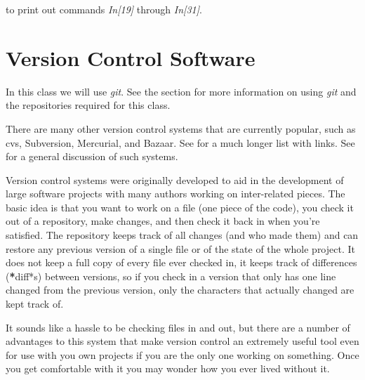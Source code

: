 \documentclass[letterpaper,10pt,english]{sphinxmanual}
\begin{document}
to print out commands \emph{In{[}19{]}} through \emph{In{[}31{]}}.


\section{Version Control Software}
\label{versioncontrol::doc}\label{versioncontrol:versioncontrol}\label{versioncontrol:version-control-software}
In this class we will use \emph{git}.  See the section {\hyperref[git:git]{}}
for more information on using \emph{git} and the repositories required for this
class.

There are many other version control systems that are currently popular,
such as cvs, Subversion, Mercurial, and Bazaar.
See \label{versioncontrol:id1}{\hyperref[biblio:wikipedia\string-revision\string-control\string-software]{}} for a much longer list with
links.
See \label{versioncontrol:id2}{\hyperref[biblio:wikipedia\string-revision\string-control]{}} for a general discussion of such systems.

Version control systems were originally developed to aid in the development
of large software projects with many authors working on inter-related
pieces.  The basic idea is that you want to work on a file (one piece of the
code), you check it out of a repository, make changes, and then check it
back in when you're satisfied.  The repository keeps track of all changes
(and who made them) and can restore any previous version of a single file or
of the state of the whole project.  It does not keep a full copy of every
file ever checked in, it keeps track of differences ({\color{red}\bfseries{}*}diff*s) between
versions, so if you check in a version that only has one line changed from
the previous version, only the characters that actually changed are kept
track of.

It sounds like a hassle to be checking files in and out, but there are a
number of advantages to this system that make version control an
extremely useful tool even for use with you own projects if you are the only
one working on something.  Once you get comfortable with it you may wonder
how you ever lived without it.
\end{document}
